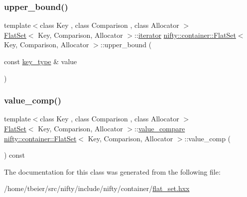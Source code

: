 \mbox{\label{classnifty_1_1container_1_1FlatSet_ad29a9db87f15925db9d5569482720b5b}} 
\subsubsection{\texorpdfstring{upper\+\_\+bound()}{upper\_bound()}\hspace{0.1cm}{\footnotesize\ttfamily [2/2]}}
{\footnotesize\ttfamily template$<$class Key , class Comparison , class Allocator $>$ \\
\hyperlink{classnifty_1_1container_1_1FlatSet}{Flat\+Set}$<$ Key, Comparison, Allocator $>$\+::\hyperlink{classnifty_1_1container_1_1FlatSet_a9c7fd20cd6b1878ccb8a7e068072c795}{iterator} \hyperlink{classnifty_1_1container_1_1FlatSet}{nifty\+::container\+::\+Flat\+Set}$<$ Key, Comparison, Allocator $>$\+::upper\+\_\+bound (\begin{DoxyParamCaption}\item[{const \hyperlink{classnifty_1_1container_1_1FlatSet_a0101a4574052389646be8d9bf092a949}{key\+\_\+type} \&}]{value }\end{DoxyParamCaption})\hspace{0.3cm}{\ttfamily [inline]}}

\mbox{\label{classnifty_1_1container_1_1FlatSet_aebece9a30a7237adb9b8f95ad4442e91}} 
\subsubsection{\texorpdfstring{value\+\_\+comp()}{value\_comp()}}
{\footnotesize\ttfamily template$<$class Key , class Comparison , class Allocator $>$ \\
\hyperlink{classnifty_1_1container_1_1FlatSet}{Flat\+Set}$<$ Key, Comparison, Allocator $>$\+::\hyperlink{classnifty_1_1container_1_1FlatSet_a4ec0fabbb2d2f25b985c12581c576384}{value\+\_\+compare} \hyperlink{classnifty_1_1container_1_1FlatSet}{nifty\+::container\+::\+Flat\+Set}$<$ Key, Comparison, Allocator $>$\+::value\+\_\+comp (\begin{DoxyParamCaption}{ }\end{DoxyParamCaption}) const\hspace{0.3cm}{\ttfamily [inline]}}



The documentation for this class was generated from the following file\+:\begin{DoxyCompactItemize}
\item 
/home/tbeier/src/nifty/include/nifty/container/\hyperlink{flat__set_8hxx}{flat\+\_\+set.\+hxx}\end{DoxyCompactItemize}

